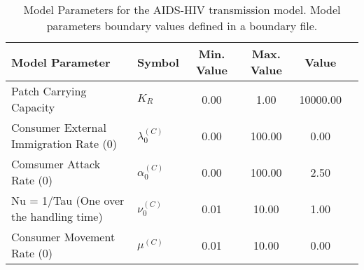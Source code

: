 \begin{table}
\centering
\begin{tabular}{p{5cm}lcccc}
{\bf Model Parameter} & {\bf Symbol} & {\bf Min. Value} & {\bf Max. Value} & {\bf Value}\\
\hline\hline
Patch Carrying Capacity & $K_R$ & 0.00 & 1.00 & 10000.00\\
Consumer External Immigration Rate (0) & $\lambda^{(C)}_0$ & 0.00 & 100.00 & 0.00\\
Comsumer Attack Rate (0) & $\alpha^{(C)}_0$ & 0.00 & 100.00 & 2.50\\
Nu = 1/Tau (One over the handling time) & $\nu^{(C)}_0$ & 0.01 & 10.00 & 1.00\\
Consumer Movement Rate (0) & $\mu^{(C)}$ & 0.01 & 10.00 & 0.00\\
\hline\hline
\end{tabular}
\caption{Model Parameters for the AIDS-HIV transmission model. Model parameters boundary values defined in a boundary file.}
\end{table}
